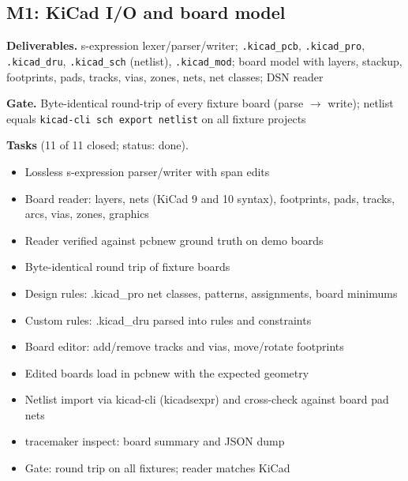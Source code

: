 \subsection*{M1: KiCad I/O and board model}
\noindent\textbf{Deliverables.} s-expression lexer/parser/writer; \texttt{.kicad\_pcb}, \texttt{.kicad\_pro}, \texttt{.kicad\_dru}, \texttt{.kicad\_sch} (netlist), \texttt{.kicad\_mod}; board model with layers, stackup, footprints, pads, tracks, vias, zones, nets, net classes; DSN reader\par\smallskip
\noindent\textbf{Gate.} Byte-identical round-trip of every fixture board (parse $\to$ write); netlist equals \texttt{kicad-cli sch export netlist} on all fixture projects\par\smallskip
\noindent\textbf{Tasks} (11 of 11 closed; status: done).
\begin{itemize}[leftmargin=1.6em,itemsep=1pt]
\item[\textcolor{fraqua}{$\checkmark$}] Lossless s-expression parser/writer with span edits
\item[\textcolor{fraqua}{$\checkmark$}] Board reader: layers, nets (KiCad 9 and 10 syntax), footprints, pads, tracks, arcs, vias, zones, graphics
\item[\textcolor{fraqua}{$\checkmark$}] Reader verified against pcbnew ground truth on demo boards
\item[\textcolor{fraqua}{$\checkmark$}] Byte-identical round trip of fixture boards
\item[\textcolor{fraqua}{$\checkmark$}] Design rules: .kicad\_pro net classes, patterns, assignments, board minimums
\item[\textcolor{fraqua}{$\checkmark$}] Custom rules: .kicad\_dru parsed into rules and constraints
\item[\textcolor{fraqua}{$\checkmark$}] Board editor: add/remove tracks and vias, move/rotate footprints
\item[\textcolor{fraqua}{$\checkmark$}] Edited boards load in pcbnew with the expected geometry
\item[\textcolor{fraqua}{$\checkmark$}] Netlist import via kicad-cli (kicadsexpr) and cross-check against board pad nets
\item[\textcolor{fraqua}{$\checkmark$}] tracemaker inspect: board summary and JSON dump
\item[\textcolor{fraqua}{$\checkmark$}] Gate: round trip on all fixtures; reader matches KiCad
\end{itemize}
